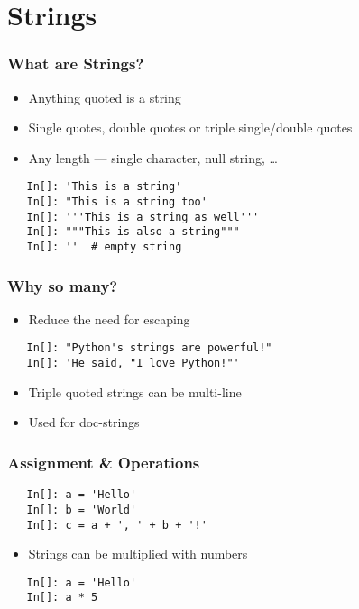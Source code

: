 \section{Strings}

\begin{frame}[fragile]
  \frametitle{What are Strings?}
  \begin{itemize}
  \item Anything quoted is a string
  \item Single quotes, double quotes or triple single/double quotes
  \item Any length --- single character, null string, \ldots
  \end{itemize}
  \begin{lstlisting}
   In[]: 'This is a string'
   In[]: "This is a string too'
   In[]: '''This is a string as well'''
   In[]: """This is also a string"""
   In[]: ''  # empty string
  \end{lstlisting}
\end{frame}

\begin{frame}[fragile]
  \frametitle{Why so many?}
  \begin{itemize}
  \item Reduce the need for escaping 
  \end{itemize}
  \begin{lstlisting}
   In[]: "Python's strings are powerful!"
   In[]: 'He said, "I love Python!"'
  \end{lstlisting}
  \begin{itemize}
  \item Triple quoted strings can be multi-line
  \item Used for doc-strings
  \end{itemize}
\end{frame}

\begin{frame}[fragile]
  \frametitle{Assignment \& Operations}
  \begin{lstlisting}
   In[]: a = 'Hello'
   In[]: b = 'World'
   In[]: c = a + ', ' + b + '!'
  \end{lstlisting}
  \begin{itemize}
  \item Strings can be multiplied with numbers
  \end{itemize}
  \begin{lstlisting}
   In[]: a = 'Hello'
   In[]: a * 5
  \end{lstlisting}
\end{frame}

